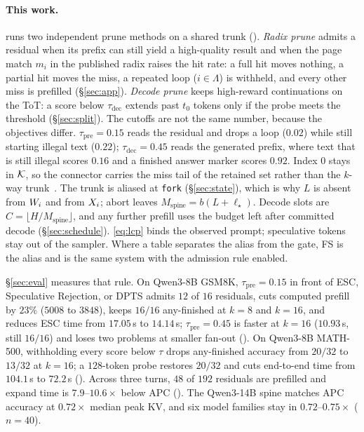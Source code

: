 \paragraph{This work.}
\sys runs two independent prune methods on a shared trunk ().
\emph{Radix prune} admits a residual when its prefix can still yield a high-quality result and when the page match $m_i$ in the published radix raises the hit rate: a full hit moves nothing, a partial hit moves the miss, a repeated loop ($i{\in}\Lambda$) is withheld, and every other miss is prefilled (\S\ref{sec:app}).
\emph{Decode prune} keeps high-reward continuations on the ToT: a score below $\tau_{\mathrm{dec}}$ extends past $t_0$ tokens only if the probe meets the threshold (\S\ref{sec:split}).
The cutoffs are not the same number, because the objectives differ.
$\tau_{\mathrm{pre}}{=}0.15$ reads the residual and drops a loop ($0.02$) while still starting illegal text ($0.22$); $\tau_{\mathrm{dec}}{=}0.45$ reads the generated prefix, where text that is still illegal scores $0.16$ and a finished answer marker scores $0.92$.
Index $0$ stays in $\mathcal{K}$, so the connector carries the miss tail of the retained set rather than the $k$-way trunk~\cite{distserve,splitwise}.
The trunk is aliased at \texttt{fork} (\S\ref{sec:state}), which is why $L$ is absent from $W_i$ and from $X_i$; abort leaves $M_{\mathrm{spine}}=b(L+\ell_\star)$.
Decode slots are $C=\lfloor H/M_{\mathrm{spine}}\rfloor$, and any further prefill uses the budget left after committed decode (\S\ref{sec:schedule}).
\eqref{eq:lcp} binds the observed prompt; speculative tokens stay out of the sampler.
Where a table separates the alias from the gate, FS is the alias and \plus{} is the same system with the admission rule enabled.

\S\ref{sec:eval} measures that rule.
On Qwen3-8B GSM8K, $\tau_{\mathrm{pre}}{=}0.15$ in front of ESC, Speculative Rejection, or DPTS admits $12$ of $16$ residuals, cuts computed prefill by $23\%$ ($5008$ to $3848$), keeps $16/16$ any-finished at $k{=}8$ and $k{=}16$, and reduces ESC time from $17.05$\,s to $14.14$\,s; $\tau_{\mathrm{pre}}{=}0.45$ is faster at $k{=}16$ ($10.93$\,s, still $16/16$) and loses two problems at smaller fan-out ().
On Qwen3-8B MATH-500, withholding every score below $\tau$ drops any-finished accuracy from $20/32$ to $13/32$ at $k{=}16$; a $128$-token probe restores $20/32$ and cuts end-to-end time from $104.1$\,s to $72.2$\,s ().
Across three turns, $48$ of $192$ residuals are prefilled and expand time is $7.9$--$10.6\times$ below APC ().
The Qwen3-14B spine matches APC accuracy at $0.72\times$ median peak KV, and six model families stay in $0.72$--$0.75\times$ ($n{=}40$).

